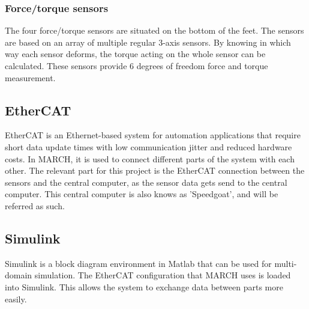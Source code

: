 \subsubsection{Force/torque sensors}
The four force/torque sensors are situated on the bottom of the feet. The sensors are based on an array of multiple regular 3-axis sensors. By knowing in which way each sensor deforms, the torque acting on the whole sensor can be calculated. These sensors provide 6 degrees of freedom force and torque measurement.
\subsection{EtherCAT}\label{sec:etherCat}
EtherCAT is an Ethernet-based system for automation applications that require short data update times with low communication jitter and reduced hardware costs. In MARCH, it is used to connect different parts of the system with each other. The relevant part for this project is the EtherCAT connection between the sensors and the central computer, as the sensor data gets send to the central computer. This central computer is also knows as 'Speedgoat', and will be referred as such.
\subsection{Simulink} 
Simulink is a block diagram environment in Matlab that can be used for multi-domain simulation. The EtherCAT configuration that MARCH uses is loaded into Simulink. This allows the system to exchange data between parts more easily. 

